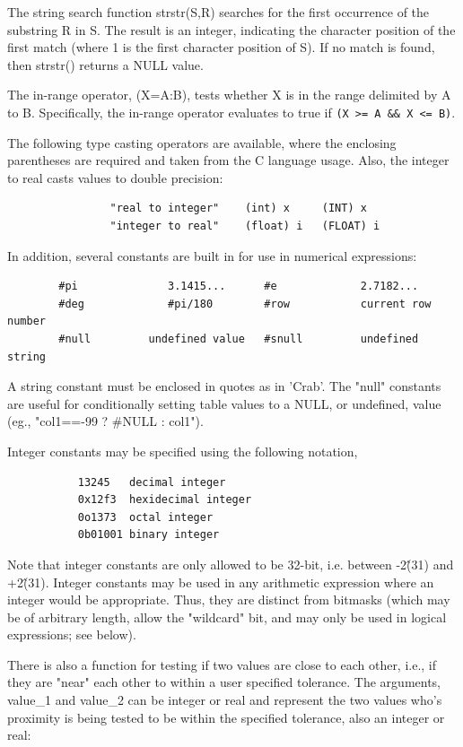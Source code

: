 \documentclass[11pt]{book}
\begin{document}
The string search function strstr(S,R) searches for the first
occurrence of the substring R in S.  The result is an integer,
indicating the character position of the first match (where 1 is the
first character position of S).  If no match is found, then strstr()
returns a NULL value.

The in-range operator, (X=A:B), tests whether X is in the range
delimited by A to B.  Specifically, the in-range operator evaluates
to true if \verb+(X >= A && X <= B)+.

The following type casting operators are available, where the
enclosing parentheses are required and taken from the C language
usage. Also, the integer to real casts values to double precision:

\begin{verbatim}
                "real to integer"    (int) x     (INT) x
                "integer to real"    (float) i   (FLOAT) i
\end{verbatim}

    In addition, several constants are built in  for  use  in  numerical
    expressions:


\begin{verbatim}
        #pi              3.1415...      #e             2.7182...
        #deg             #pi/180        #row           current row number
        #null         undefined value   #snull         undefined string
\end{verbatim}

    A  string constant must  be enclosed  in quotes  as in  'Crab'.  The
    "null" constants  are useful for conditionally  setting table values
    to a NULL, or undefined, value (eg., "col1==-99 ? \#NULL : col1").

    Integer constants may be specified using the following notation,
\begin{verbatim}
           13245   decimal integer
           0x12f3  hexidecimal integer
           0o1373  octal integer
           0b01001 binary integer
\end{verbatim}
    Note that integer constants are only allowed to be 32-bit, i.e.
    between -2\^(31) and +2\^(31).  Integer constants may be used in any
    arithmetic expression where an integer would be appropriate.  Thus,
    they are distinct from bitmasks (which may be of arbitrary length,
    allow the "wildcard" bit, and may only be used in logical
    expressions; see below).

    There is also a function for testing if  two  values  are  close  to
    each  other,  i.e.,  if  they are "near" each other to within a user
    specified tolerance. The  arguments,  value\_1  and  value\_2  can  be
    integer  or  real  and  represent  the two values who's proximity is
    being tested to be within the specified tolerance, also  an  integer
    or real:
\end{document}
